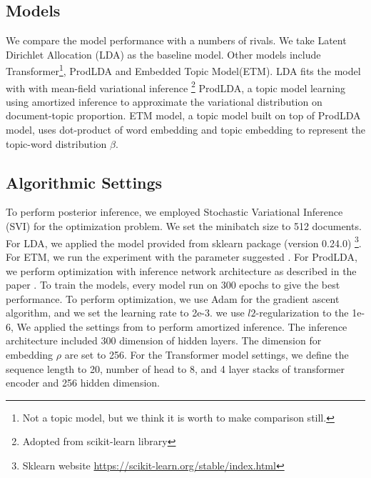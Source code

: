 \subsection{Models}\label{ch4:result_model}
We compare the model performance with a numbers of rivals. We take Latent Dirichlet Allocation (LDA)\cite{blei_latent_2003} as the baseline model. Other models include Transformer\cite{vaswani_attention_nodate}\footnote{Not a topic model, but we think it is worth to make comparison still.},  ProdLDA\cite{srivastava_autoencoding_2017} and Embedded Topic Model(ETM)\cite{dieng_topic_2019}.
LDA fits the model with with mean-field variational inference \footnote{Adopted from \textmd{scikit-learn} library}
ProdLDA, a topic model learning using amortized inference to approximate the variational distribution on document-topic proportion.
ETM model, a topic model built on top of ProdLDA model, uses dot-product of word embedding and topic embedding to represent the topic-word distribution $ \beta $.
\subsection{Algorithmic Settings}
To perform posterior inference, we employed Stochastic Variational Inference (SVI) \cite{hoffman_stochastic_2013} for the optimization problem. We set the minibatch size to 512 documents.
For LDA, we applied the model provided from sklearn package (version 0.24.0) \footnote{Sklearn website \url{https://scikit-learn.org/stable/index.html}}. For ETM, we run the experiment with the parameter suggested \cite{dieng_topic_2019}. For ProdLDA, we perform optimization with inference network architecture as described in the paper \cite{srivastava_autoencoding_2017}. 
To train the models, every model run on 300 epochs to give the best performance. 
To perform optimization, we use Adam for the gradient ascent algorithm, and we set the learning rate to 2e-3.
we use $ l2 $-regularization to the 1e-6,
We applied the settings from \cite{srivastava_autoencoding_2017} to perform amortized inference. The inference architecture included 300 dimension of hidden layers. 
The dimension for embedding $ \rho $ are set to 256.
For the Transformer model settings, we define the sequence length to 20, number of head to 8, and 4 layer stacks of transformer encoder and 256 hidden dimension.
